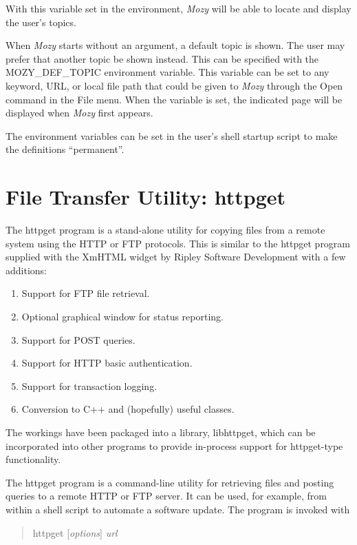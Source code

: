 With this variable set in the environment, {\it Mozy} will be able to
locate and display the user's topics.

When {\it Mozy} starts without an argument, a default topic is shown. 
The user may prefer that another topic be shown instead.  This can be
specified with the {\vt MOZY\_DEF\_TOPIC} environment variable.  This
variable can be set to any keyword, URL, or local file path that could
be given to {\it Mozy} through the {\cb Open} command in the {\cb
File} menu.  When the variable is set, the indicated page will be
displayed when {\it Mozy} first appears.

The environment variables can be set in the user's shell startup
script to make the definitions ``permanent''.


\section{File Transfer Utility:  {\vt httpget}}

The {\vt httpget} program is a stand-alone utility for copying files
from a remote system using the HTTP or FTP protocols.  This is similar
to the {\vt httpget} program supplied with the XmHTML widget by Ripley
Software Development with a few additions:

\begin{enumerate}
\item{Support for FTP file retrieval.}
\item{Optional graphical window for status reporting.}
\item{Support for POST queries.}
\item{Support for HTTP basic authentication.}
\item{Support for transaction logging.}
\item{Conversion to C++ and (hopefully) useful classes.}
\end{enumerate}

The workings have been packaged into a library, {\vt libhttpget},
which can be incorporated into other programs to provide in-process
support for httpget-type functionality.

The {\vt httpget} program is a command-line utility for retrieving
files and posting queries to a remote HTTP or FTP server.  It can be
used, for example, from within a shell script to automate a software
update.  The program is invoked with

\begin{quote}
{\vt httpget} [{\it options\/}] {\it url}
\end{quote}

